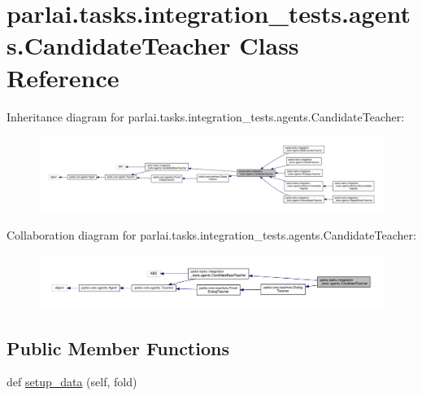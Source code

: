 \hypertarget{classparlai_1_1tasks_1_1integration__tests_1_1agents_1_1CandidateTeacher}{}\section{parlai.\+tasks.\+integration\+\_\+tests.\+agents.\+Candidate\+Teacher Class Reference}
\label{classparlai_1_1tasks_1_1integration__tests_1_1agents_1_1CandidateTeacher}


Inheritance diagram for parlai.\+tasks.\+integration\+\_\+tests.\+agents.\+Candidate\+Teacher\+:
\nopagebreak
\begin{figure}[H]
\begin{center}
\leavevmode
\includegraphics[width=350pt]{d4/d48/classparlai_1_1tasks_1_1integration__tests_1_1agents_1_1CandidateTeacher__inherit__graph}
\end{center}
\end{figure}


Collaboration diagram for parlai.\+tasks.\+integration\+\_\+tests.\+agents.\+Candidate\+Teacher\+:
\nopagebreak
\begin{figure}[H]
\begin{center}
\leavevmode
\includegraphics[width=350pt]{d9/d03/classparlai_1_1tasks_1_1integration__tests_1_1agents_1_1CandidateTeacher__coll__graph}
\end{center}
\end{figure}
\subsection*{Public Member Functions}
\begin{DoxyCompactItemize}
\item 
def \hyperlink{classparlai_1_1tasks_1_1integration__tests_1_1agents_1_1CandidateTeacher_a9dafcc2731525aa45337b2d6816ad9a6}{setup\+\_\+data} (self, fold)
\end{DoxyCompactItemize}
